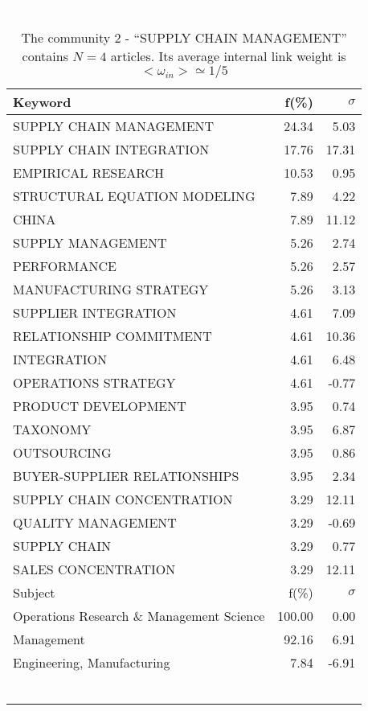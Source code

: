 \documentclass[a4paper,11pt]{report}
\begin{document}
\begin{landscape}
\clearpage

\begin{table}[!ht]
\caption{The community 2 - ``SUPPLY CHAIN MANAGEMENT'' contains $N = 4$ articles. Its average internal link weight is $<\omega_{in}> \simeq 1/5$ }
\textcolor{white}{aa}\\
{\scriptsize\begin{tabular}{|l r r|}
\hline
Keyword & f(\%) & $\sigma$\\
\hline
SUPPLY CHAIN MANAGEMENT & 24.34 & 5.03\\
SUPPLY CHAIN INTEGRATION & 17.76 & 17.31\\
EMPIRICAL RESEARCH & 10.53 & 0.95\\
STRUCTURAL EQUATION MODELING & 7.89 & 4.22\\
CHINA & 7.89 & 11.12\\
SUPPLY MANAGEMENT & 5.26 & 2.74\\
PERFORMANCE & 5.26 & 2.57\\
MANUFACTURING STRATEGY & 5.26 & 3.13\\
SUPPLIER INTEGRATION & 4.61 & 7.09\\
RELATIONSHIP COMMITMENT & 4.61 & 10.36\\
INTEGRATION & 4.61 & 6.48\\
OPERATIONS STRATEGY & 4.61 & -0.77\\
PRODUCT DEVELOPMENT & 3.95 & 0.74\\
TAXONOMY & 3.95 & 6.87\\
OUTSOURCING & 3.95 & 0.86\\
BUYER-SUPPLIER RELATIONSHIPS & 3.95 & 2.34\\
SUPPLY CHAIN CONCENTRATION & 3.29 & 12.11\\
QUALITY MANAGEMENT & 3.29 & -0.69\\
SUPPLY CHAIN & 3.29 & 0.77\\
SALES CONCENTRATION & 3.29 & 12.11\\
\hline
\hline
Subject & f(\%) & $\sigma$\\
\hline
Operations Research \& Management Science & 100.00 & 0.00\\
Management & 92.16 & 6.91\\
Engineering, Manufacturing & 7.84 & -6.91\\
 &  & \\
 &  & \\
 &  & \\
 &  & \\
 &  & \\
 &  & \\

\end{tabular}}
\end{table}
\end{landscape}
\end{document}
